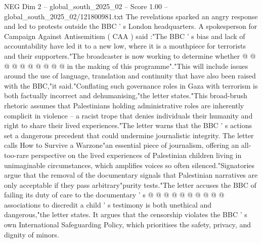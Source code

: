 \begin{textsample}{NEG Dim 2 – global\_south\_2025\_02 – Score 1.00 – global\_south\_2025\_02/121800981.txt}
The revelations sparked an angry response and led to protests outside the BBC ' s London headquarters.
A spokesperson for Campaign Against Antisemitism ( CAA ) said :"The BBC ' s bias and lack of accountability have led it to a new low, where it is a mouthpiece for terrorists and their supporters."The broadcaster is now working to determine whether @ @ @ @ @ @ @ @ @ @ in the making of this programme"."This will include issues around the use of language, translation and continuity that have also been raised with the BBC,"it said."Conflating such governance roles in Gaza with terrorism is both factually incorrect and dehumanising,"the letter states."This broad-brush rhetoric assumes that Palestinians holding administrative roles are inherently complicit in violence -- a racist trope that denies individuals their humanity and right to share their lived experiences."The letter warns that the BBC ' s actions set a dangerous precedent that could undermine journalistic integrity.
The letter calls How to Survive a Warzone"an essential piece of journalism, offering an all-too-rare perspective on the lived experiences of Palestinian children living in unimaginable circumstances, which amplifies voices so often silenced."Signatories argue that the removal of the documentary signals that Palestinian narratives are only acceptable if they pass arbitrary"purity tests."The letter accuses the BBC of failing its duty of care to the documentary ' s @ @ @ @ @ @ @ @ @ @ associations to discredit a child ' s testimony is both unethical and dangerous,"the letter states.
It argues that the censorship violates the BBC ' s own International Safeguarding Policy, which prioritises the safety, privacy, and dignity of minors.

\end{textsample}
